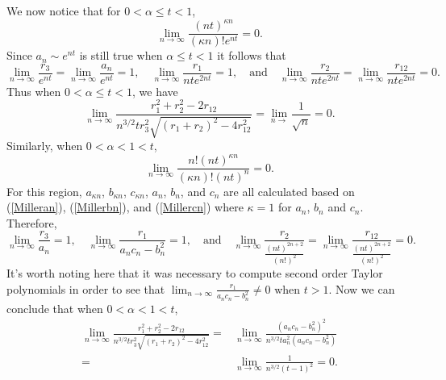 \documentclass[12pt]{amsart}
\theoremstyle{remark}
\begin{document}
We now notice that for $0<\alpha\le t<1$,
\[\lim_{n\rightarrow\infty}\frac{(nt)^{\kappa n}}{(\kappa n)!e^{nt}}=0.\]
Since $a_n\sim e^{nt}$ is still true when $\alpha\le t<1$ it follows that
\[\lim_{n\rightarrow\infty}\frac{r_3}{e^{nt}}=\lim_{n\rightarrow\infty}\frac{a_n}{e^{nt}}=1,\quad\lim_{n\rightarrow\infty}\frac{r_1}{nte^{2nt}}=1,\quad\text{and}\quad\lim_{n\rightarrow\infty}\frac{r_2}{nte^{2nt}}=\lim_{n\rightarrow\infty}\frac{r_{12}}{nte^{2nt}}=0.\]
Thus when $0<\alpha\le t<1$, we have
\[\lim_{n\rightarrow\infty}\frac{r_1^2+r_2^2-2r_{12}}{n^{3/2}tr_3^2\sqrt{(r_1+r_2)^2-4r_{12}^2}}=\lim_{n\rightarrow}\frac{1}{\sqrt{n}}=0.\]
Similarly, when $0<\alpha<1<t$,
\[\lim_{n\rightarrow\infty}\frac{n!(nt)^{\kappa n}}{(\kappa n)!(nt)^{n}}=0.\]
For this region, $a_{\kappa n}$, $b_{\kappa n}$, $c_{\kappa n}$, $a_n$, $b_n$, and $c_n$ are all calculated based on (\ref{Milleran}), (\ref{Millerbn}), and (\ref{Millercn}) where $\kappa=1$ for $a_n$, $b_n$ and $c_n$.  Therefore,
\[\lim_{n\rightarrow\infty}\frac{r_3}{a_n}=1,\quad\lim_{n\rightarrow\infty}\frac{r_1}{a_nc_n-b_n^2}=1,\quad\text{and}\quad\lim_{n\rightarrow\infty}\frac{r_2}{\frac{(nt)^{2n+2}}{(n!)^2}}=\lim_{n\rightarrow\infty}\frac{r_{12}}{\frac{(nt)^{2n+2}}{(n!)^2}}=0.\]
It's worth noting here that it was necessary to compute second order Taylor polynomials in order to see that $\lim_{n\rightarrow\infty}\frac{r_1}{a_nc_n-b_n^2}\neq0$ when $t>1$. Now we can conclude that when $0<\alpha<1<t$,
\begin{align*}
	\lim_{n\rightarrow\infty}\frac{r_1^2+r_2^2-2r_{12}}
	{n^{3/2}tr_3^2\sqrt{(r_1+r_2)^2-4r_{12}^2}}
	=&\lim_{n\rightarrow\infty}\frac{(a_nc_n-b_n^2)^2}
	{n^{3/2}ta_n^2(a_nc_n-b_n^2)}
	\\=&\lim_{n\rightarrow\infty}\frac{1}{n^{3/2}(t-1)^2}=0.
\end{align*}
\end{document}
